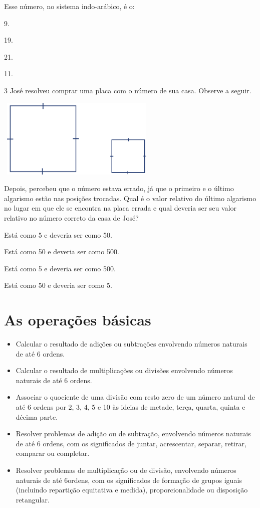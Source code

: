 Esse número, no sistema indo-arábico, é o:

\begin{escolha}
\item
  9.
\item
  19.
\item
  21.
\item
  11.
\end{escolha}


\num{3} José resolveu comprar uma placa com o número de sua casa. Observe a seguir.

\includegraphics[width=3.02500in,height=1.48973in]{media/image26.png}

Depois, percebeu que o número estava
errado, já que o primeiro e o último algarismo estão nas posições
trocadas. Qual é o valor relativo do último algarismo no lugar em que ele se
encontra na placa errada e qual deveria ser seu valor relativo no número
correto da casa de José?

\begin{escolha}
\item
  Está como 5 e deveria ser como 50.
\item
  Está como 50 e deveria ser como 500.
\item
  Está como 5 e deveria ser como 500.
\item
  Está como 50 e deveria ser como 5.
\end{escolha}

\chapter{As operações básicas}


\begin{itemize}
\item Calcular o resultado de adições ou subtrações envolvendo números
naturais de até 6 ordens.
\item Calcular o resultado de multiplicações ou divisões envolvendo números
naturais de até 6 ordens.
\item Associar o quociente de uma divisão com resto zero de um número
natural de até 6 ordens por 2, 3, 4, 5 e 10 às ideias de metade, terça,
quarta, quinta e décima parte.
\item Resolver problemas de adição ou de subtração, envolvendo números
naturais de até 6 ordens, com os significados de juntar, acrescentar,
separar, retirar, comparar ou completar.
\item Resolver problemas de multiplicação ou de divisão, envolvendo números
naturais de até 6ordens, com os significados de formação de grupos
iguais (incluindo repartição equitativa e medida), proporcionalidade ou
disposição retangular.
\end{itemize}

